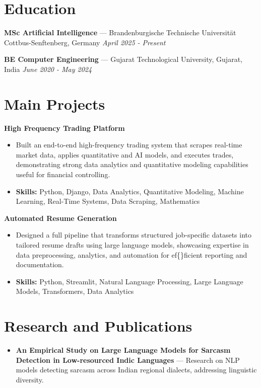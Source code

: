 \documentclass[a4paper,10pt]{article}
\begin{document}
\section*{Education}
\textbf{MSc Artificial Intelligence} — Brandenburgische Technische Universität Cottbus-Senftenberg, Germany \hfill \textit{April 2025 - Present}\par
\vspace{1.5pt}
\textbf{BE Computer Engineering} — Gujarat Technological University, Gujarat, India \hfill \textit{June 2020 - May 2024}\par

\section*{Main Projects}
\textbf{High Frequency Trading Platform}\par
\vspace{1pt}
\begin{itemize}
  \item Built an end-to-end high-frequency trading system that scrapes real-time market data, applies quantitative and AI models, and executes trades, demonstrating strong data analytics and quantitative modeling capabilities useful for financial controlling.
  \item \textbf{Skills:} Python, Django, Data Analytics, Quantitative Modeling, Machine Learning, Real-Time Systems, Data Scraping, Mathematics
\end{itemize}
\vspace{3pt}
\textbf{Automated Resume Generation}\par
\vspace{1pt}
\begin{itemize}
  \item Designed a full pipeline that transforms structured job-specific datasets into tailored resume drafts using large language models, showcasing expertise in data preprocessing, analytics, and automation for ef\{\}ficient reporting and documentation.
  \item \textbf{Skills:} Python, Streamlit, Natural Language Processing, Large Language Models, Transformers, Data Analytics
\end{itemize}

\section*{Research and Publications}
\begin{itemize}
\item \textbf{An Empirical Study on Large Language Models for Sarcasm Detection in Low-resourced Indic Languages} — Research on NLP models detecting sarcasm across Indian regional dialects, addressing linguistic diversity.
\end{itemize}
\end{document}
